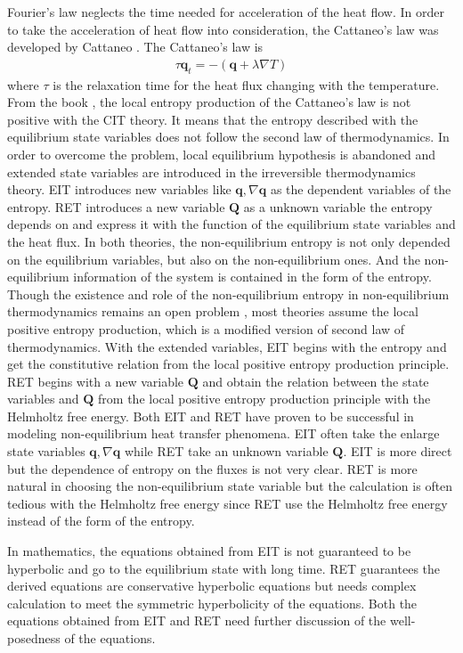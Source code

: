 \documentclass[a4paper]{article}
\begin{document}
 Fourier's law neglects the time needed for acceleration of the heat flow. In order to take the acceleration of heat flow into consideration, the Cattaneo's law was developed by Cattaneo \cite{cattaneo2011sulla}. The Cattaneo's law is 
\begin{eqnarray}
\tau \mathbf{q}_t = -(\mathbf{q}+\lambda \nabla T)
\end{eqnarray}
where $\tau$ is the relaxation time for the heat flux changing with the temperature.
From the book \cite{Jou1996extended}, the local entropy production of the Cattaneo's law is not positive with the CIT theory. It means that the entropy described with the equilibrium state variables does not follow the second law of thermodynamics. In order to overcome the problem, local equilibrium hypothesis is abandoned and extended state variables are introduced in the irreversible thermodynamics theory. EIT introduces new variables like $\mathbf{q},\nabla \mathbf{q}$ as the dependent variables of the entropy. RET introduces a new variable $\mathbf{Q}$ as a unknown variable the entropy depends on and express it with the function of the equilibrium state variables and the heat flux. In both theories, the non-equilibrium entropy is not only depended on the equilibrium variables, but also on the non-equilibrium ones. And the non-equilibrium information of the system is contained in the form of the entropy. Though the existence and role of the non-equilibrium entropy in non-equilibrium thermodynamics remains an open problem \cite{sellitto2013entropy}, most theories assume the local positive entropy production, which is a modified version of second law of thermodynamics. 
With the extended variables, EIT begins with the entropy and get the constitutive relation from the local positive entropy production principle. RET begins with a new variable $\mathbf{Q}$ and obtain the relation between the state variables and $\mathbf{Q}$ from the local positive entropy production principle with the Helmholtz free energy. Both EIT and RET have proven to be successful in modeling non-equilibrium heat transfer phenomena. EIT often take the enlarge state variables $\mathbf{q},{\nabla \mathbf{q}}$ while RET take an unknown variable $\mathbf{Q}$. EIT is more direct but the dependence of entropy on the fluxes is not very clear. RET is more natural in choosing the non-equilibrium state variable but the calculation is often tedious with the Helmholtz free energy since RET use the Helmholtz free energy instead of the form of the entropy.

In mathematics, the equations obtained from EIT is not guaranteed to be hyperbolic and go to the equilibrium state with long time. RET guarantees the derived equations are conservative hyperbolic equations but needs complex calculation to meet the symmetric hyperbolicity of the equations. Both the equations obtained from EIT and RET need further discussion of the well-posedness of the equations.
\end{document}
